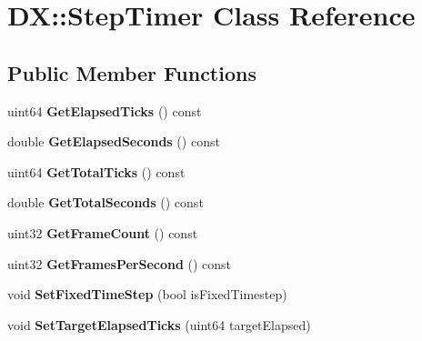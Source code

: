 \hypertarget{class_d_x_1_1_step_timer}{}\section{D\+X\+:\+:Step\+Timer Class Reference}
\label{class_d_x_1_1_step_timer}
\subsection*{Public Member Functions}
\begin{DoxyCompactItemize}
\item 
\hypertarget{class_d_x_1_1_step_timer_a60db228df3c407438c8c4d9d66926d6f}{}uint64 {\bfseries Get\+Elapsed\+Ticks} () const \label{class_d_x_1_1_step_timer_a60db228df3c407438c8c4d9d66926d6f}

\item 
\hypertarget{class_d_x_1_1_step_timer_afa6b367f05c5fcf320df1051c589f9ca}{}double {\bfseries Get\+Elapsed\+Seconds} () const \label{class_d_x_1_1_step_timer_afa6b367f05c5fcf320df1051c589f9ca}

\item 
\hypertarget{class_d_x_1_1_step_timer_a52d7c600eb1b2e8dc39658610ae4d08d}{}uint64 {\bfseries Get\+Total\+Ticks} () const \label{class_d_x_1_1_step_timer_a52d7c600eb1b2e8dc39658610ae4d08d}

\item 
\hypertarget{class_d_x_1_1_step_timer_a393ea616ba424b792a0aaddad040b970}{}double {\bfseries Get\+Total\+Seconds} () const \label{class_d_x_1_1_step_timer_a393ea616ba424b792a0aaddad040b970}

\item 
\hypertarget{class_d_x_1_1_step_timer_a499a6b9e4a9595038e3d2e06b0974be1}{}uint32 {\bfseries Get\+Frame\+Count} () const \label{class_d_x_1_1_step_timer_a499a6b9e4a9595038e3d2e06b0974be1}

\item 
\hypertarget{class_d_x_1_1_step_timer_a204de0d0d7c7344c4d33baaaa72ddb01}{}uint32 {\bfseries Get\+Frames\+Per\+Second} () const \label{class_d_x_1_1_step_timer_a204de0d0d7c7344c4d33baaaa72ddb01}

\item 
\hypertarget{class_d_x_1_1_step_timer_ab108c5203686e605af494a4ebe39cb56}{}void {\bfseries Set\+Fixed\+Time\+Step} (bool is\+Fixed\+Timestep)\label{class_d_x_1_1_step_timer_ab108c5203686e605af494a4ebe39cb56}

\item 
\hypertarget{class_d_x_1_1_step_timer_ae026efbd3f030937bd5bd2d0326d825e}{}void {\bfseries Set\+Target\+Elapsed\+Ticks} (uint64 target\+Elapsed)\label{class_d_x_1_1_step_timer_ae026efbd3f030937bd5bd2d0326d825e}


\end{DoxyCompactItemize}

